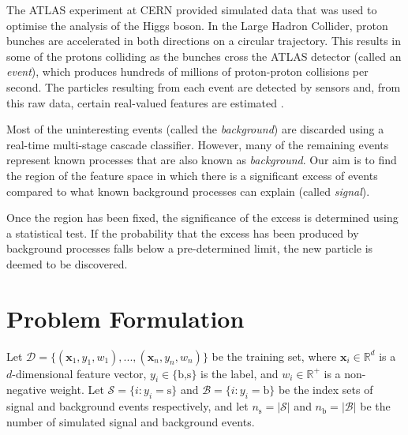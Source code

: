 \documentclass[]{article}
\begin{document}
The ATLAS experiment at CERN provided simulated data that was used to optimise the analysis of the Higgs boson. In the Large Hadron Collider, proton bunches are accelerated in both directions on a circular trajectory. This results in some of the protons colliding as the bunches cross the ATLAS detector (called an \textit{event}), which produces hundreds of millions of proton-proton collisions per second. The particles resulting from each event are detected by sensors and, from this raw data, certain real-valued features are estimated \cite{higgs-challenge}.

Most of the uninteresting events (called the \textit{background}) are discarded using a real-time multi-stage cascade classifier. However, many of the remaining events represent known processes that are also known as \textit{background}. Our aim is to find the region of the feature space in which there is a significant excess of events compared to what known background processes can explain (called \textit{signal}).

Once the region has been fixed, the significance of the excess is determined using a statistical test. If the probability that the excess has been produced by background processes falls below a pre-determined limit, the new particle is deemed to be discovered.




\section{Problem Formulation}

Let $\mathcal{D} = \{(\bm{x}_1, y_1,w_1),...,(\bm{x}_n,y_n,w_n)\}$ be the training set, where $\bm{x}_i \in \mathbb{R}^d$ is a $d$-dimensional feature vector, $y_i \in \{\text{b,s}\}$ is the label, and $w_i \in \mathbb{R}^+$ is a non-negative weight. Let $\mathcal{S} = \{i : y_i = \text{s}\}$ and $\mathcal{B} = \{i : y_i = \text{b}\}$ be the index sets of signal and background events respectively, and let $n_\text{s} = |\mathcal{S}|$ and $n_\text{b} = |\mathcal{B}|$ be the number of simulated signal and background events. 
\end{document}
